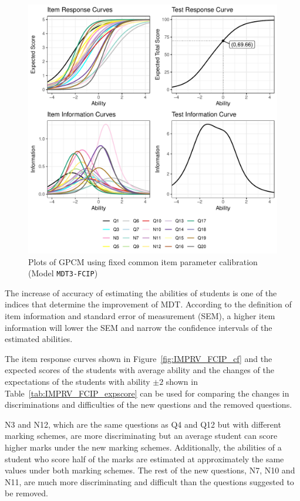 \documentclass[a4paper]{report}
\begin{document}
\begin{figure}[H]
  \centering
  \includegraphics[width=\linewidth]{fig/IMPRV_17_FCIP.pdf}
  \caption{\label{fig:IMPRV_17_FCIP}Plots of GPCM using fixed common item parameter calibration (Model \texttt{MDT3-FCIP})}
\end{figure}

The increase of accuracy of estimating the abilities of students is one of the indices that determine the improvement of MDT. According to the definition of item information and standard error of measurement (SEM), a higher item information will lower the SEM and narrow the confidence intervals of the estimated abilities. 

The item response curves shown in Figure~\ref{fig:IMPRV_FCIP_cf} and the expected scores of the students with average ability and the changes of the expectations of the students with ability $\pm 2$ shown in Table~\ref{tab:IMPRV_FCIP_expscore} can be used for comparing the changes in discriminations and difficulties of the new questions and the removed questions.

N3 and N12, which are the same questions as Q4 and Q12 but with different marking schemes, are more discriminating but an average student can score higher marks under the new marking schemes. Additionally, the abilities of a student who score half of the marks are estimated at approximately the same values under both marking schemes. The rest of the new questions, N7, N10 and N11, are much more discriminating and difficult than the questions suggested to be removed. 
\end{document}
